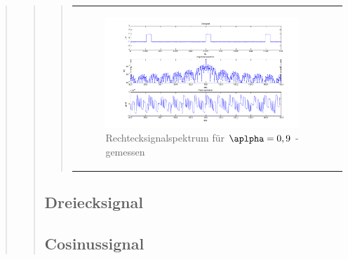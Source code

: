 \begin{quote}
\begin{quote}
\begin{quote}
\begin{center}
\begin{tabular}{ll}
\begin{minipage}{0.6\textwidth}
                    \begin{figure}[H]
                        \label{fig:}            
                        \includegraphics[scale=0.3]{./Bilder/recht_alpha1_-_gemessen.png} %
                        \caption{Rechtecksignalspektrum für $\aplpha = 0,9$ - gemessen}
                    \end{figure}                
                
                \end{minipage}
                        
            \end{tabular}
            \end{center}
        
    \end{quote}
    
    \subsection{Dreiecksignal}
    \begin{quote}
        
    \end{quote}
    
    \subsection{Cosinussignal}
    \begin{quote}
        
    \end{quote}


    
    


    
        
\end{quote}






\end{quote}
